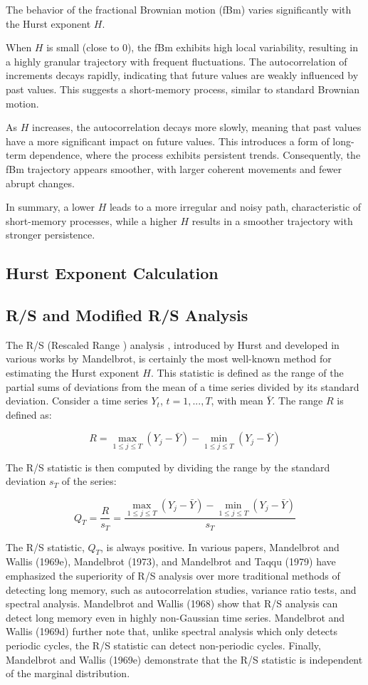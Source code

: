 \documentclass[11pt]{extarticle}
\begin{document}
\FloatBarrier

The behavior of the fractional Brownian motion (fBm) varies significantly with the Hurst exponent \( H \).

When \( H \) is small (close to 0), the fBm exhibits high local variability, resulting in a highly granular trajectory with frequent fluctuations. The autocorrelation of increments decays rapidly, indicating that future values are weakly influenced by past values. This suggests a short-memory process, similar to standard Brownian motion.

As \( H \) increases, the autocorrelation decays more slowly, meaning that past values have a more significant impact on future values. This introduces a form of long-term dependence, where the process exhibits persistent trends. Consequently, the fBm trajectory appears smoother, with larger coherent movements and fewer abrupt changes.

In summary, a lower \( H \) leads to a more irregular and noisy path, characteristic of short-memory processes, while a higher \( H \) results in a smoother trajectory with stronger persistence.

\subsection{Hurst Exponent Calculation}
\subsection{R/S and Modified R/S Analysis}
The R/S (Rescaled Range ) analysis , introduced by Hurst and developed in various works by Mandelbrot, is certainly the most well-known method for estimating the Hurst exponent $H$. This statistic is defined as the range of the partial sums of deviations from the mean of a time series divided by its standard deviation. Consider a time series $Y_t$, $t = 1, ..., T$, with mean $\bar{Y}$. The range $R$ is defined as:

\[
R = \max_{1 \leq j \leq T} \left( Y_j - \bar{Y} \right) - \min_{1 \leq j \leq T} \left( Y_j - \bar{Y} \right)
\]

The R/S statistic is then computed by dividing the range by the standard deviation $s_T$ of the series:

\[
Q_T = \frac{R}{s_T} = \frac{\max_{1 \leq j \leq T} \left( Y_j - \bar{Y} \right) - \min_{1 \leq j \leq T} \left( Y_j - \bar{Y} \right)}{s_T}
\]

The R/S statistic, $Q_T$, is always positive. In various papers, Mandelbrot and Wallis (1969e), Mandelbrot (1973), and Mandelbrot and Taqqu (1979) have emphasized the superiority of R/S analysis over more traditional methods of detecting long memory, such as autocorrelation studies, variance ratio tests, and spectral analysis. Mandelbrot and Wallis (1968) show that R/S analysis can detect long memory even in highly non-Gaussian time series. Mandelbrot and Wallis (1969d) further note that, unlike spectral analysis which only detects periodic cycles, the R/S statistic can detect non-periodic cycles. Finally, Mandelbrot and Wallis (1969e) demonstrate that the R/S statistic is independent of the marginal distribution.
\end{document}
